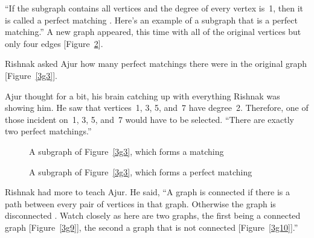 ``If the subgraph contains all vertices and the degree of every vertex is~1, then it is called a perfect matching . Here's an example of a subgraph that is a perfect matching.'' A new graph appeared, this time with all of the original vertices but only four edges [Figure~\ref{3g8}].

Rishnak asked Ajur how many perfect matchings there were in the original graph [Figure~\ref{3g3}].

Ajur thought for a bit, his brain catching up with everything Rishnak was showing him. He saw that vertices~1, 3, 5, and~7 have degree~2. Therefore, one of those incident on~1, 3, 5, and~7 would have to be selected. ``There are exactly two perfect matchings.''

\begin{figure}
\begin{center}
\caption{A subgraph of Figure~\ref{3g3}, which forms a matching}\label{3g7}
\end{center}
\end{figure}

\begin{figure}
\begin{center}
\caption{A subgraph of Figure~\ref{3g3}, which forms a perfect matching}\label{3g8}
\end{center}
\end{figure}

Rishnak had more to teach Ajur.  He said, ``A graph is connected  if there is a path between every pair of vertices in that graph. Otherwise the graph is disconnected . Watch closely as here are two graphs, the first being a connected graph [Figure~\ref{3g9}], the second a graph that is not connected [Figure~\ref{3g10}].''

